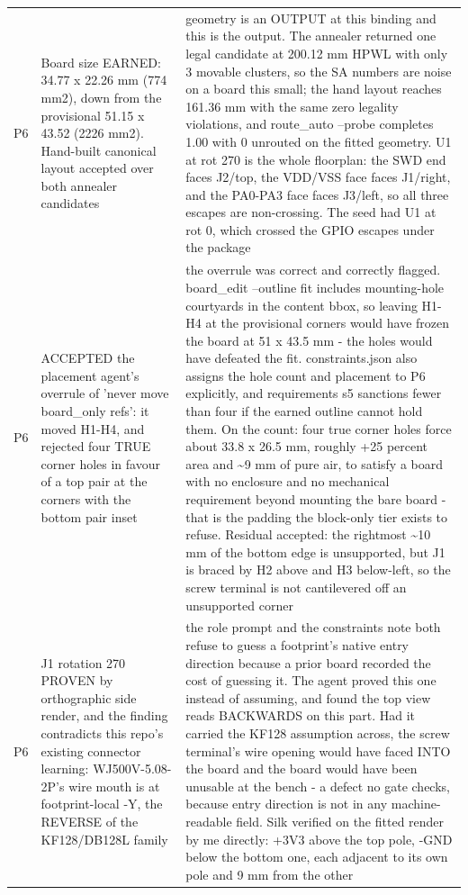\documentclass[11pt,a4paper]{article}
\begin{document}
{\begin{longtable}{lp{5.2cm}p{7.2cm}}
P6 & Board size EARNED: 34.77 x 22.26 mm (774 mm2), down from the provisional 51.15 x 43.52 (2226 mm2). Hand-built canonical layout accepted over both annealer candidates & geometry is an OUTPUT at this binding and this is the output. The annealer returned one legal candidate at 200.12 mm HPWL with only 3 movable clusters, so the SA numbers are noise on a board this small; the hand layout reaches 161.36 mm with the same zero legality violations, and route\_auto --probe completes 1.00 with 0 unrouted on the fitted geometry. U1 at rot 270 is the whole floorplan: the SWD end faces J2/top, the VDD/VSS face faces J1/right, and the PA0-PA3 face faces J3/left, so all three escapes are non-crossing. The seed had U1 at rot 0, which crossed the GPIO escapes under the package \\
P6 & ACCEPTED the placement agent's overrule of 'never move board\_only refs': it moved H1-H4, and rejected four TRUE corner holes in favour of a top pair at the corners with the bottom pair inset & the overrule was correct and correctly flagged. board\_edit --outline fit includes mounting-hole courtyards in the content bbox, so leaving H1-H4 at the provisional corners would have frozen the board at 51 x 43.5 mm - the holes would have defeated the fit. constraints.json also assigns the hole count and placement to P6 explicitly, and requirements s5 sanctions fewer than four if the earned outline cannot hold them. On the count: four true corner holes force about 33.8 x 26.5 mm, roughly +25 percent area and \textasciitilde{}9 mm of pure air, to satisfy a board with no enclosure and no mechanical requirement beyond mounting the bare board - that is the padding the block-only tier exists to refuse. Residual accepted: the rightmost \textasciitilde{}10 mm of the bottom edge is unsupported, but J1 is braced by H2 above and H3 below-left, so the screw terminal is not cantilevered off an unsupported corner \\
P6 & J1 rotation 270 PROVEN by orthographic side render, and the finding contradicts this repo's existing connector learning: WJ500V-5.08-2P's wire mouth is at footprint-local -Y, the REVERSE of the KF128/DB128L family & the role prompt and the constraints note both refuse to guess a footprint's native entry direction because a prior board recorded the cost of guessing it. The agent proved this one instead of assuming, and found the top view reads BACKWARDS on this part. Had it carried the KF128 assumption across, the screw terminal's wire opening would have faced INTO the board and the board would have been unusable at the bench - a defect no gate checks, because entry direction is not in any machine-readable field. Silk verified on the fitted render by me directly: +3V3 above the top pole, -GND below the bottom one, each adjacent to its own pole and 9 mm from the other \\

\end{longtable}}
\end{document}
